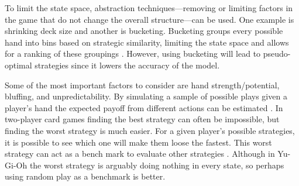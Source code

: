 To limit the state space, abstraction techniques---removing or limiting factors in the game that do not change the overall structure---can be used. One example is shrinking deck size and another is bucketing. Bucketing groups every possible hand into bins based on strategic similarity, limiting the state space and allows for a ranking of these groupings \citep{Billings:2003}. However, using bucketing will lead to pseudo-optimal strategies since it lowers the accuracy of the model.

Some of the most important factors to consider are hand strength/potential, bluffing, and unpredictability. By simulating a sample of possible plays given a player's hand the expected payoff from different actions can be estimated \citep{Billings:1999}. In two-player card games finding the best strategy can often be impossible, but finding the worst strategy is much easier. For a given player's possible strategies, it is possible to see which one will make them loose the fastest. This worst strategy can act as a bench mark to evaluate other strategies \citep{Gilpin:2006}. Although in Yu-Gi-Oh the worst strategy is arguably doing nothing in every state, so perhaps using random play as a benchmark is better.




